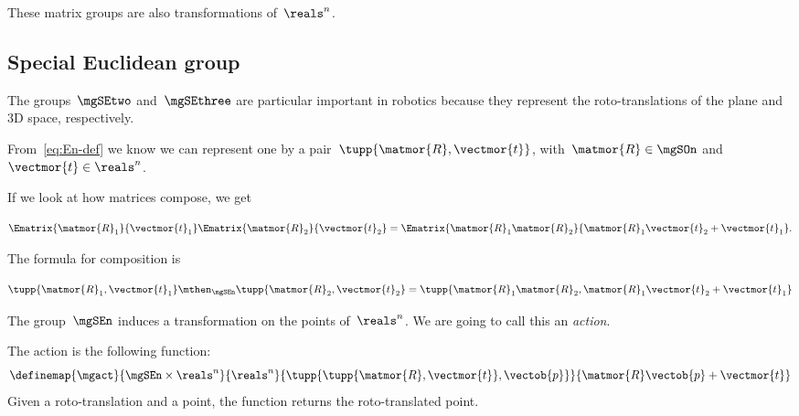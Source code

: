 These matrix groups are also transformations of~$\reals^n$.

\subsection{Special Euclidean group}

The groups~$\mgSEtwo$ and~$\mgSEthree$ are particular important in robotics because they represent the roto-translations of the plane and 3D space, respectively.

From~\cref{eq:En-def} we know we can represent one by a pair~$\tupp{\matmor{R}, \vectmor{t}}$, with~$\matmor{R}\in\mgSOn$ and~$\vectmor{t} \in \reals^n$.

If we look at how matrices compose, we get

\begin{equation}
\Ematrix{\matmor{R}_1}{\vectmor{t}_1} \Ematrix{\matmor{R}_2}{\vectmor{t}_2} = \Ematrix{\matmor{R}_1 \matmor{R}_2}{\matmor{R}_1\vectmor{t}_2 + \vectmor{t}_1}.
\end{equation}

The formula for composition is

\begin{equation}
  \tupp{\matmor{R}_1, \vectmor{t}_1} \mthen_{\mgSEn} \tupp{\matmor{R}_2, \vectmor{t}_2}  = \tupp{\matmor{R}_1 \matmor{R}_2, \matmor{R}_1 \vectmor{t}_2 + \vectmor{t}_1}
\end{equation}

%

The group~$\mgSEn$ induces a transformation on the points of~$\reals^n$.
We are going to call this an \emph{action}.

The action is the following function:
\begin{equation}
\definemap{\mgact}{\mgSEn \times \reals^n}{\reals^n}{\tupp{ \tupp{\matmor{R}, \vectmor{t}}, \vectob{p}}}{\matmor{R}\vectob{p} + \vectmor{t}}
\end{equation}
Given a roto-translation and a point, the function returns the roto-translated point.
%

